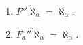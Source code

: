 \begin{enumerate}
\item $\overline{F'' \aleph_\alpha} = \aleph_\alpha$.
\item $\overline{F_a'' \aleph_\alpha} = \aleph_\alpha$.
\end{enumerate}
